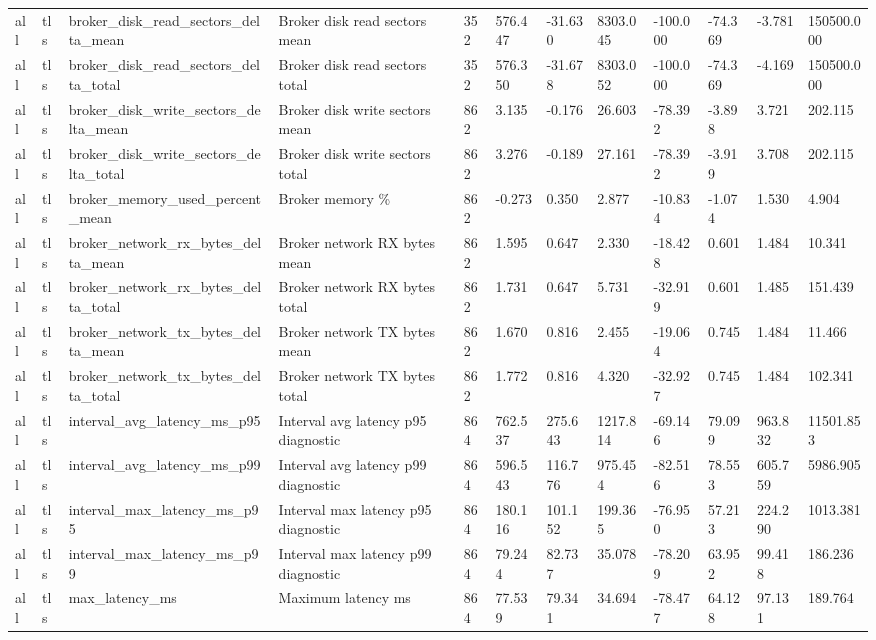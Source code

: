 \begin{longtable}{llllllllllll}
all & tls & broker\_disk\_read\_sectors\_delta\_mean & Broker disk read sectors mean & 352 & 576.447 & -31.630 & 8303.045 & -100.000 & -74.369 & -3.781 & 150500.000 \\
all & tls & broker\_disk\_read\_sectors\_delta\_total & Broker disk read sectors total & 352 & 576.350 & -31.678 & 8303.052 & -100.000 & -74.369 & -4.169 & 150500.000 \\
all & tls & broker\_disk\_write\_sectors\_delta\_mean & Broker disk write sectors mean & 862 & 3.135 & -0.176 & 26.603 & -78.392 & -3.898 & 3.721 & 202.115 \\
all & tls & broker\_disk\_write\_sectors\_delta\_total & Broker disk write sectors total & 862 & 3.276 & -0.189 & 27.161 & -78.392 & -3.919 & 3.708 & 202.115 \\
all & tls & broker\_memory\_used\_percent\_mean & Broker memory \% & 862 & -0.273 & 0.350 & 2.877 & -10.834 & -1.074 & 1.530 & 4.904 \\
all & tls & broker\_network\_rx\_bytes\_delta\_mean & Broker network RX bytes mean & 862 & 1.595 & 0.647 & 2.330 & -18.428 & 0.601 & 1.484 & 10.341 \\
all & tls & broker\_network\_rx\_bytes\_delta\_total & Broker network RX bytes total & 862 & 1.731 & 0.647 & 5.731 & -32.919 & 0.601 & 1.485 & 151.439 \\
all & tls & broker\_network\_tx\_bytes\_delta\_mean & Broker network TX bytes mean & 862 & 1.670 & 0.816 & 2.455 & -19.064 & 0.745 & 1.484 & 11.466 \\
all & tls & broker\_network\_tx\_bytes\_delta\_total & Broker network TX bytes total & 862 & 1.772 & 0.816 & 4.320 & -32.927 & 0.745 & 1.484 & 102.341 \\
all & tls & interval\_avg\_latency\_ms\_p95 & Interval avg latency p95 diagnostic & 864 & 762.537 & 275.643 & 1217.814 & -69.146 & 79.099 & 963.832 & 11501.853 \\
all & tls & interval\_avg\_latency\_ms\_p99 & Interval avg latency p99 diagnostic & 864 & 596.543 & 116.776 & 975.454 & -82.516 & 78.553 & 605.759 & 5986.905 \\
all & tls & interval\_max\_latency\_ms\_p95 & Interval max latency p95 diagnostic & 864 & 180.116 & 101.152 & 199.365 & -76.950 & 57.213 & 224.290 & 1013.381 \\
all & tls & interval\_max\_latency\_ms\_p99 & Interval max latency p99 diagnostic & 864 & 79.244 & 82.737 & 35.078 & -78.209 & 63.952 & 99.418 & 186.236 \\
all & tls & max\_latency\_ms & Maximum latency ms & 864 & 77.539 & 79.341 & 34.694 & -78.477 & 64.128 & 97.131 & 189.764 \\

\end{longtable}

